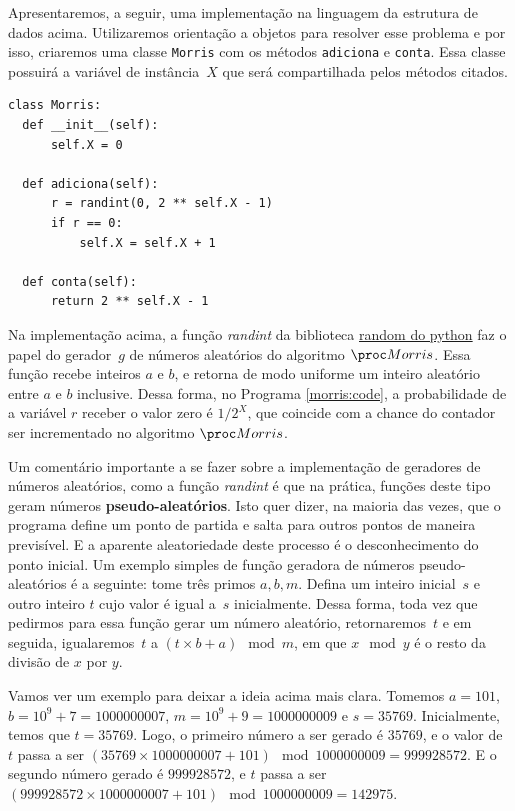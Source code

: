 Apresentaremos, a seguir, uma implementação na linguagem  da estrutura de dados acima. Utilizaremos 
orientação a objetos para resolver esse problema e por isso, criaremos uma classe \texttt{Morris} com os métodos 
\texttt{adiciona} e \texttt{conta}. Essa classe possuirá a variável de instância~$X$ que será compartilhada pelos 
métodos citados.

\begin{lstlisting}[style=mypython,caption=Implementação do algoritmo $\Morris$,captionpos=b, label=morris:code]
class Morris:
  def __init__(self):
      self.X = 0

  def adiciona(self):
      r = randint(0, 2 ** self.X - 1)
      if r == 0:
          self.X = self.X + 1

  def conta(self):
      return 2 ** self.X - 1
\end{lstlisting}

Na implementação acima, a função \textit{randint} da biblioteca \hyperref[PythonRandom]{random do python} faz o papel do 
gerador~$g$ de números aleatórios do algoritmo $\Morris$. Essa função recebe inteiros $a$ e $b$, e retorna de modo 
uniforme um inteiro aleatório entre $a$ e $b$ inclusive. Dessa forma, no Programa \ref{morris:code}, a probabilidade de 
a variável $r$ receber o valor zero é $1/2^{X}$, que coincide com a chance do contador ser incrementado no algoritmo 
$\Morris$.

Um comentário importante a se fazer sobre a implementação de geradores de números aleatórios, como a função 
\textit{randint} é que na prática, funções deste tipo geram números \textbf{pseudo-aleatórios}. Isto quer dizer, na 
maioria das vezes, que o programa define um ponto de partida e salta para outros pontos de maneira previsível. E a 
aparente aleatoriedade deste processo é o desconhecimento do ponto inicial. Um exemplo simples de função geradora de 
números pseudo-aleatórios é a seguinte: tome três primos $a, b, m$. Defina um inteiro inicial~$s$ e outro inteiro $t$ 
cujo valor é igual a~$s$ inicialmente. Dessa forma, toda vez que pedirmos para essa função gerar um número aleatório, 
retornaremos~$t$ e em seguida, igualaremos~$t$ a $(t \times b + a) \mod m$, em que $x \mod y$ é o resto da divisão de 
$x$ por $y$.

Vamos ver um exemplo para deixar a ideia acima mais clara. Tomemos $a = 101$, $b = 10^9 + 7 = 1000000007$, 
$m = 10^9 + 9 = 1000000009$ e $s = 35769$. Inicialmente, temos que $t = 35769$. Logo, o primeiro número a ser gerado é
$35769$, e o valor de $t$ passa a ser $(35769 \times 1000000007 + 101) \mod 1000000009 = 999928572$. E o segundo número
gerado é $999928572$, e $t$ passa a ser $(999928572 \times 1000000007 + 101) \mod 1000000009 = 142975$.

